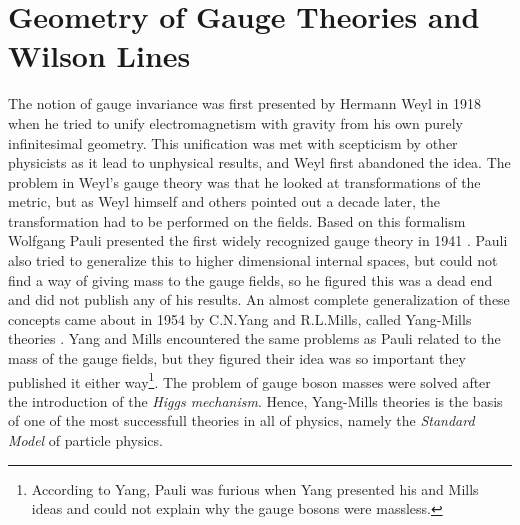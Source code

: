 \chapter{Geometry of Gauge Theories and Wilson Lines}\label{chap:Geometry of gauge theories}

The notion of gauge invariance was first presented by Hermann Weyl in 1918 when he tried to unify electromagnetism with gravity from his own purely infinitesimal geometry. This unification was met with scepticism by other physicists as it lead to unphysical results, and Weyl first abandoned the idea. The problem in Weyl's gauge theory was that he looked at transformations of the metric, but as Weyl himself and others pointed out a decade later, the transformation had to be performed on the fields. Based on this formalism Wolfgang Pauli presented the first widely recognized gauge theory in 1941  \cite{RevModPhys.13.203}. Pauli also tried to generalize this to higher dimensional internal spaces, but could not find a way of giving mass to the gauge fields, so he figured this was a dead end and did not publish any of his results. An almost complete generalization of these concepts came about in 1954 by C.N.Yang and R.L.Mills, called Yang-Mills theories  \cite{PhysRev.96.191}. Yang and Mills encountered the same problems as Pauli related to the mass of the gauge fields, but they figured their idea was so important they published it either way\footnote{According to Yang, Pauli was furious when Yang presented his and Mills ideas and could not explain why the gauge bosons were massless.}. The problem of gauge boson masses were solved after the introduction of the \emph{Higgs mechanism}. Hence, Yang-Mills theories is the basis of one of the most successfull theories in all of physics, namely the \emph{Standard Model} of particle physics.



